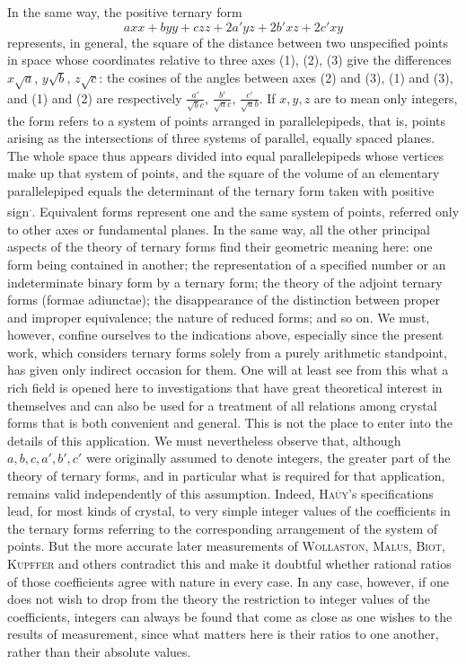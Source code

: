 In the same way, the positive ternary form
\[
axx+byy+czz+2a'yz+2b'xz+2c'xy
\]
represents, in general, the square of the distance between two unspecified points in space whose coordinates relative to three axes (1), (2), (3) give the differences $x\surd a$, $y\surd b$, $z\surd c$:
the cosines of the angles between axes (2) and (3), (1) and (3), and (1) and (2) are respectively $\frac{a'}{\surd bc}$, $\frac{b'}{\surd ac}$, $\frac{c'}{\surd ab}$. If $x,y,z$ are to mean only integers, the form refers to a system of points arranged in parallelepipeds, that is, points arising as the intersections of three systems of parallel, equally spaced planes. The whole space thus appears divided into equal parallelepipeds whose vertices make up that system of points, and the square of the volume of an elementary parallelepiped equals the determinant of the ternary form taken with positive sign\textsuperscript{.}. Equivalent forms represent one and the same system of points, referred only to other axes or fundamental planes. In the same way, all the other principal aspects of the theory of ternary forms find their geometric meaning here: one form being contained in another; the representation of a specified number or an indeterminate binary form by a ternary form; the theory of the adjoint ternary forms (formae adiunctae); the disappearance of the distinction between proper and improper equivalence; the nature of reduced forms; and so on. We must, however, confine ourselves to the indications above, especially since the present work, which considers ternary forms solely from a purely arithmetic standpoint, has given only indirect occasion for them. One will at least see from this what a rich field is opened here to investigations that have great theoretical interest in themselves and can also be used for a treatment of all relations among crystal forms that is both convenient and general. This is not the place to enter into the details of this application. We must nevertheless observe that, although $a,b,c,a',b',c'$ were originally assumed to denote integers, the greater part of the theory of ternary forms, and in particular what is required for that application, remains valid independently of this assumption. Indeed, \textsc{Haüy}'s specifications lead, for most kinds of crystal, to very simple integer values of the coefficients in the ternary forms referring to the corresponding arrangement of the system of points. But the more accurate later measurements of \textsc{Wollaston}, \textsc{Malus}, \textsc{Biot}, \textsc{Kupffer} and others contradict this and make it doubtful whether rational ratios of those coefficients agree with nature in every case. In any case, however, if one does not wish to drop from the theory the
restriction to integer values of the coefficients, integers can always be found that come as close as one wishes to the results of measurement, since what matters here is their ratios to one another, rather than their absolute values.

